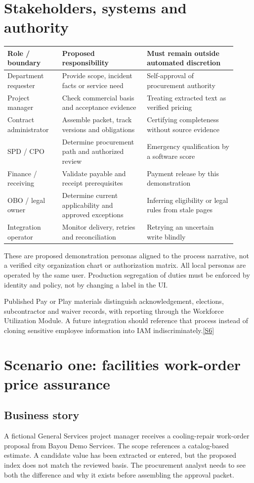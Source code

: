 \documentclass[11pt,letterpaper]{article}
\newcommand{\src}[1]{\hyperref[src:#1]{[#1]}}
\begin{document}
\section{Stakeholders, systems and authority}
\begin{longtable}{p{0.22\linewidth}p{0.34\linewidth}p{0.36\linewidth}}
\toprule Role / boundary & Proposed responsibility & Must remain outside automated discretion\\\midrule
Department requester & Provide scope, incident facts or service need & Self-approval of procurement authority\\
Project manager & Check commercial basis and acceptance evidence & Treating extracted text as verified pricing\\
Contract administrator & Assemble packet, track versions and obligations & Certifying completeness without source evidence\\
SPD / CPO & Determine procurement path and authorized review & Emergency qualification by a software score\\
Finance / receiving & Validate payable and receipt prerequisites & Payment release by this demonstration\\
OBO / legal owner & Determine current applicability and approved exceptions & Inferring eligibility or legal rules from stale pages\\
Integration operator & Monitor delivery, retries and reconciliation & Retrying an uncertain write blindly\\
\bottomrule
\end{longtable}
These are proposed demonstration personas aligned to the process narrative, not a verified city organization chart or authorization matrix. All local personas are operated by the same user. Production segregation of duties must be enforced by identity and policy, not by changing a label in the UI.

Published Pay or Play materials distinguish acknowledgement, elections, subcontractor and waiver records, with reporting through the Workforce Utilization Module. A future integration should reference that process instead of cloning sensitive employee information into IAM indiscriminately.\src{S6}

\section{Scenario one: facilities work-order price assurance}
\subsection{Business story}
A fictional General Services project manager receives a cooling-repair work-order proposal from Bayou Demo Services. The scope references a catalog-based estimate. A candidate value has been extracted or entered, but the proposed index does not match the reviewed basis. The procurement analyst needs to see both the difference and why it exists before assembling the approval packet.
\end{document}

